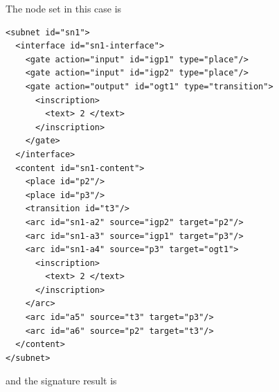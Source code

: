 The node set in this case is

\begin{lstlisting}[basicstyle=\ttfamily\tiny]
<subnet id="sn1">
  <interface id="sn1-interface">
    <gate action="input" id="igp1" type="place"/>
    <gate action="input" id="igp2" type="place"/>
    <gate action="output" id="ogt1" type="transition">
      <inscription>
        <text> 2 </text>
      </inscription>
    </gate>
  </interface>
  <content id="sn1-content">
    <place id="p2"/>
    <place id="p3"/>
    <transition id="t3"/>
    <arc id="sn1-a2" source="igp2" target="p2"/>
    <arc id="sn1-a3" source="igp1" target="p3"/>
    <arc id="sn1-a4" source="p3" target="ogt1">
      <inscription>
        <text> 2 </text>
      </inscription>
    </arc>
    <arc id="a5" source="t3" target="p3"/>
    <arc id="a6" source="p2" target="t3"/>
  </content>
</subnet>
\end{lstlisting}

and the signature result is

